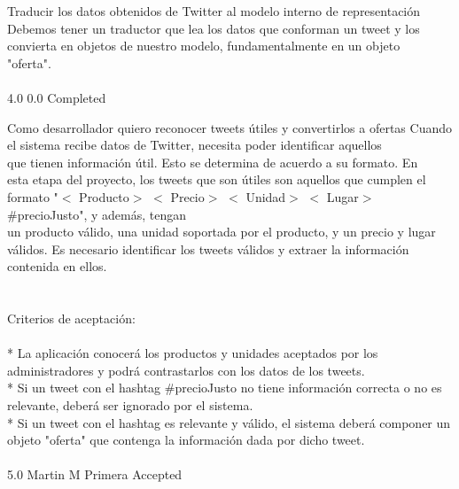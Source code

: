 		{Traducir los datos obtenidos de Twitter al modelo interno de representación} %
		{Debemos tener un traductor que lea los datos que conforman un tweet y los\\
convierta en objetos de nuestro modelo, fundamentalmente en un objeto\\
"oferta".\\
\\
} %
		{4.0} %
		{} %
		{0.0} %
		{Completed} %


\vspace{20pt}

	{Como desarrollador quiero reconocer tweets útiles y convertirlos a ofertas} %
	{Cuando el sistema recibe datos de Twitter, necesita poder identificar aquellos\\
que tienen información útil. Esto se determina de acuerdo a su formato. En\\
esta etapa del proyecto, los tweets que son útiles son aquellos que cumplen el\\
formato "$<$ Producto$>$  $<$ Precio$>$  $<$ Unidad$>$  $<$ Lugar$>$  #precioJusto", y además, tengan\\
un producto válido, una unidad soportada por el producto, y un precio y lugar\\
válidos. Es necesario identificar los tweets válidos y extraer la información\\
contenida en ellos.\\
\\
  \\
Criterios de aceptación:\\
\\
* La aplicación conocerá los productos y unidades aceptados por los administradores y podrá contrastarlos con los datos de los tweets.  \\
* Si un tweet con el hashtag #precioJusto no tiene información correcta o no es relevante, deberá ser ignorado por el sistema.  \\
* Si un tweet con el hashtag es relevante y válido, el sistema deberá componer un objeto "oferta" que contenga la información dada por dicho tweet.\\
\\
} %
	{} %
	{5.0} %
	{Martin M} %
	{Primera} %
	{Accepted} %

